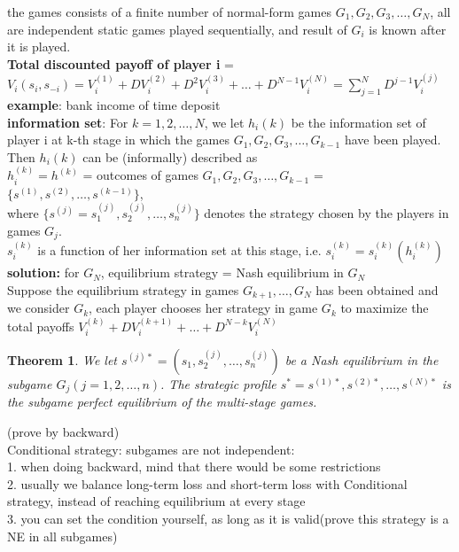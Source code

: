 \documentclass[twoside]{article}
\theoremstyle{definitionstyle}
\newtheorem*{theorem}{Theorem}
\begin{document}
the games consists of a finite number of normal-form games $G_1, G_2, G_3, \ldots , G_N$, all are independent static games played sequentially, and result of $G_i$ is known after it is played.\\
\textbf{Total discounted payoff of player i} = $V_i(s_i, s_{-i}) = V_i^{(1)} + DV_i^{(2)}+D^2V_i^{(3)} + \ldots + D^{N-1}V_i^{(N)} = \sum_{j=1}^N D^{j-1}V_i^{(j)}$\\
\textbf{example}: bank income of time deposit\\
\textbf{information set}: For $k = 1,2, \ldots , N$, we let $h_i(k)$ be the information set of player i at k-th
stage in which the games $G_1, G_2, G_3, \ldots , G_{k-1}$ have been played. Then $h_i(k)$ can 
be (informally) described as \\
$h_i^{(k)} = h^{(k)}$ = outcomes of games $G_1, G_2, G_3, \ldots , G_{k-1}$ = $\{s^{(1)}, s^{(2)}, \ldots, s^{(k-1)}\}$,\\
where $\{s^{(j)} = s_1^{(j)}, s_2^{(j)}, \ldots, s_n^{(j)}\}$ denotes the strategy chosen by the 
players in games $G_j$. \\
$s_i^{(k)}$ is a function of her information set at this stage, i.e. $s_i^{(k)} = s_i^{(k)}(h_i^{(k)})$\\
\textbf{solution:} for $G_N$, equilibrium strategy = Nash equilibrium in $G_N$\\
Suppose the equilibrium strategy in games $G_{k+1}, \ldots, G_N$ has been obtained and we consider $G_k$, each player chooses her strategy in game $G_k$ to maximize the total payoffs $V_i^{(k)}+DV_i^{(k+1)}+\ldots + D^{N-k}V_i^{(N)}$ \\
\begin{theorem}
  We let $s^{(j)*} = (s_1, s_2^{(j)}, \ldots, s_n^{(j)})$ be a Nash equilibrium in the subgame $G_j(j = 1,2, \ldots, n)$. The strategic profile $s^* = s^{(1)*}, s^{(2)*}, \ldots, s^{(N)*}$ is the 
subgame perfect equilibrium of the multi-stage games. 
\end{theorem}
(prove by backward)\\
Conditional strategy: subgames are not independent: \\
1. when doing backward, mind that there would be some restrictions\\
2. usually we balance long-term loss and short-term loss with Conditional strategy, instead of reaching equilibrium at every stage\\
3. you can set the condition yourself, as long as it is valid(prove this strategy is a NE in all subgames)\\
\end{document}
